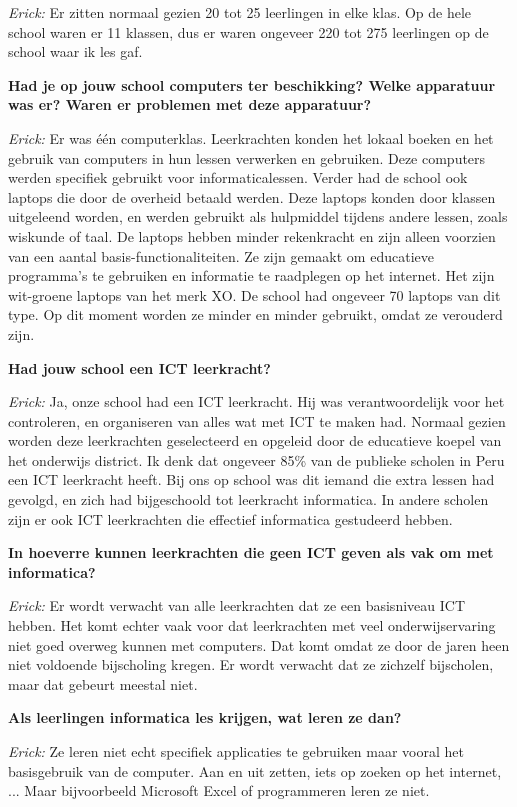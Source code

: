 \textit{Erick:} Er zitten normaal gezien 20 tot 25 leerlingen in elke klas. Op de hele school waren er 11 klassen, dus er waren ongeveer 220 tot 275 leerlingen op de school waar ik les gaf. %

\textbf{Had je op jouw school computers ter beschikking? Welke apparatuur was er? Waren er problemen met deze apparatuur?}

\textit{Erick:} Er was één computerklas. Leerkrachten konden het lokaal boeken en het gebruik van computers in hun lessen verwerken en gebruiken. Deze computers werden specifiek gebruikt voor informaticalessen. Verder had de school ook laptops die door de overheid betaald werden. Deze laptops konden door klassen uitgeleend worden, en werden gebruikt als hulpmiddel tijdens andere lessen, zoals wiskunde of taal. De laptops hebben minder rekenkracht en zijn alleen voorzien van een aantal basis-functionaliteiten. Ze zijn gemaakt om educatieve programma's te gebruiken en informatie te raadplegen op het internet. Het zijn wit-groene laptops van het merk XO. De school had ongeveer 70 laptops van dit type. Op dit moment worden ze minder en minder gebruikt, omdat ze verouderd  zijn.

\textbf{Had jouw school een ICT leerkracht?}

\textit{Erick:} Ja, onze school had een ICT leerkracht. Hij was verantwoordelijk voor het controleren, en organiseren van alles wat met ICT te maken had. Normaal gezien worden deze leerkrachten geselecteerd en opgeleid door de educatieve koepel van het onderwijs district. Ik denk dat ongeveer 85\% van de publieke scholen in Peru een ICT leerkracht heeft. Bij ons op school was dit iemand die extra lessen had gevolgd, en zich had bijgeschoold tot leerkracht informatica. In andere scholen zijn er ook ICT leerkrachten die effectief informatica gestudeerd hebben.

\textbf{In hoeverre kunnen leerkrachten die geen ICT geven als vak om met informatica?}

\textit{Erick:} Er wordt verwacht van alle leerkrachten dat ze een basisniveau ICT hebben. Het komt echter vaak voor dat leerkrachten met veel onderwijservaring niet goed overweg kunnen met computers. Dat komt omdat ze door de jaren heen niet voldoende bijscholing kregen. Er wordt verwacht dat ze zichzelf bijscholen, maar dat gebeurt meestal niet.

\textbf{Als leerlingen informatica les krijgen, wat leren ze dan?}

\textit{Erick:} Ze leren niet echt specifiek applicaties te gebruiken maar vooral het basisgebruik van de computer. Aan en uit zetten, iets op zoeken op het internet, ... Maar bijvoorbeeld Microsoft Excel of programmeren leren ze niet.

